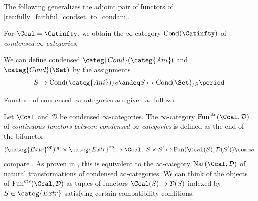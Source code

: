 \documentclass[leqno]{article}
\renewcommand{\Fun}{\mathrm{Fun}}
\renewcommand{\cts}{\mathrm{cts}}
\renewcommand{\Functs}{\Fun^{\cts}}
\newcommand{\Ani}{\categ{Ani}}
\DeclareMathOperator{\Cond}{Cond}
\newcommand{\ICond}{\categ{Cond}}
\newcommand{\CondAni}{\Cond(\Ani)}
\newcommand{\CondCat}{\Cond(\Catinfty)}
\newcommand{\CondGrp}{\Cond(\Grp)}
\newcommand{\Extr}{\categ{Extr}}
\newcommand{\cond}{\mathrm{cond}}
\begin{document}
%
The following generalizes the adjoint pair of functors of \cref{rec:fully_faithful_condset_to_condani}.
%
%
For $\Ccal=\Catinfty$, we obtain the $\infty$-category $\CondCat$ of \textit{condensed $\infty$-categories}.
%
\begin{example}
	We can define condensed \categories $ \ICond(\Ani) $ and $ \ICond(\Set) $ by the assignments
	\begin{equation*}
		S \mapsto \CondAni_{/S} \andeq S \mapsto \Cond(\Set)_{/S} \period
	\end{equation*}
\end{example}
%
Functors of condensed $\infty$-categories are given as follows.
%
\begin{recollection}\label{rec:contfunc}
Let $\Ccal$ and $\mathcal{D}$ be condensed $\infty$-categories. 
The $\infty$-category $\Functs(\Ccal,\mathcal{D})$ of \textit{continuous functors between condensed $\infty$-categories} is defined as the end of the bifunctor $$(\Extr^{\mathrm{op}})^{\mathrm{op}} \times \Extr^{\mathrm{op}} \rightarrow \Ccal, \ S\times S' \mapsto \Fun(\Ccal(S), \mathcal{D}(S'))\comma $$ 
compare \cite[Definition 13.3.16]{Exodromy}. As proven in \cite[Proposition 2.3]{MR3518559}, this is equivalent to the $\infty$-category $\mathrm{Nat}(\Ccal,\mathcal{D})$ of natural transformations of condensed $\infty$-categories.
We can think of the objects  of $\Functs(\Ccal,\mathcal{D})$ as tuples of functors $\Ccal(S)\rightarrow \mathcal{D}(S)$ indexed by $S\in \Extr$ satisfying certain compatibility conditions. 
\end{recollection}
%
\end{document}
